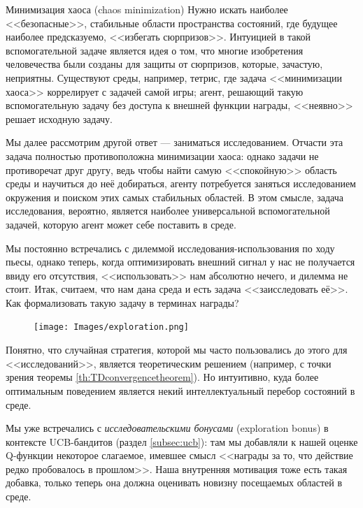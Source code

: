 \begin{exampleBox}[label=ex:chaosminimization]{Минимизация хаоса (chaos minimization)}
Нужно искать наиболее <<безопасные>>, стабильные области пространства состояний, где будущее наиболее предсказуемо, <<избегать сюрпризов>>. Интуицией в такой вспомогательной задаче является идея о том, что многие изобретения человечества были созданы для защиты от сюрпризов, которые, зачастую, неприятны. Существуют среды, например, тетрис, где задача <<минимизации хаоса>> коррелирует с задачей самой игры; агент, решающий такую вспомогательную задачу без доступа к внешней функции награды, <<неявно>> решает исходную задачу.
\end{exampleBox}

Мы далее рассмотрим другой ответ --- заниматься исследованием. Отчасти эта задача полностью противоположна минимизации хаоса: однако задачи не противоречат друг другу, ведь чтобы найти самую <<спокойную>> область среды и научиться до неё добираться, агенту потребуется заняться исследованием окружения и поиском этих самых стабильных областей. В этом смысле, задача исследования, вероятно, является наиболее универсальной вспомогательной задачей, которую агент может себе поставить в среде.

Мы постоянно встречались с дилеммой исследования-использования по ходу пьесы, однако теперь, когда оптимизировать внешний сигнал у нас не получается ввиду его отсутствия, <<использовать>> нам абсолютно нечего, и дилемма не стоит. Итак, считаем, что нам дана среда и есть задача <<заисследовать её>>. Как формализовать такую задачу в терминах награды?

\begin{figure}
\vspace{-0.4cm}
\centering
\texttt{[image: Images/exploration.png]}
\vspace{-0.5cm}
\end{figure}

Понятно, что случайная стратегия, которой мы часто пользовались до этого для <<исследований>>, является теоретическим решением (например, с точки зрения теоремы \ref{th:TDconvergencetheorem}). Но интуитивно, куда более оптимальным поведением является некий интеллектуальный перебор состояний в среде.

Мы уже встречались с \emph{исследовательскими бонусами} (exploration bonus) в контексте UCB-бандитов (раздел \ref{subsec:ucb}): там мы добавляли к нашей оценке Q-функции некоторое слагаемое, имевшее смысл <<награды за то, что действие редко пробовалось в прошлом>>. Наша внутренняя мотивация тоже есть такая добавка, только теперь она должна оценивать новизну посещаемых областей в среде.


